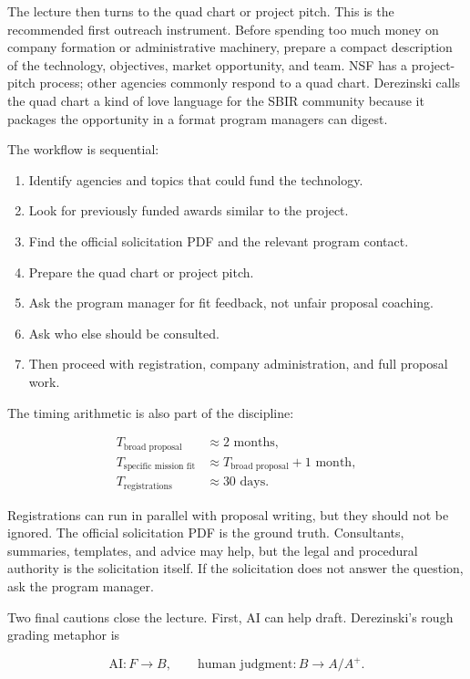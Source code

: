 The lecture then turns to the quad chart or project pitch. This is the recommended first outreach instrument. Before spending too much money on company formation or administrative machinery, prepare a compact description of the technology, objectives, market opportunity, and team. NSF has a project-pitch process; other agencies commonly respond to a quad chart. Derezinski calls the quad chart a kind of love language for the SBIR community because it packages the opportunity in a format program managers can digest.

The workflow is sequential:

\begin{enumerate}
\item Identify agencies and topics that could fund the technology.
\item Look for previously funded awards similar to the project.
\item Find the official solicitation PDF and the relevant program contact.
\item Prepare the quad chart or project pitch.
\item Ask the program manager for fit feedback, not unfair proposal coaching.
\item Ask who else should be consulted.
\item Then proceed with registration, company administration, and full proposal work.
\end{enumerate}

The timing arithmetic is also part of the discipline:

\begin{align}
T_{\text{broad proposal}} &\approx 2\text{ months},\\
T_{\text{specific mission fit}} &\approx T_{\text{broad proposal}}+1\text{ month},\\
T_{\text{registrations}} &\approx 30\text{ days}.
\end{align}

Registrations can run in parallel with proposal writing, but they should not be ignored. The official solicitation PDF is the ground truth. Consultants, summaries, templates, and advice may help, but the legal and procedural authority is the solicitation itself. If the solicitation does not answer the question, ask the program manager.

Two final cautions close the lecture. First, AI can help draft. Derezinski's rough grading metaphor is

\begin{equation}
\text{AI}: F\to B,
\qquad
\text{human judgment}: B\to A/A^+.
\end{equation}

